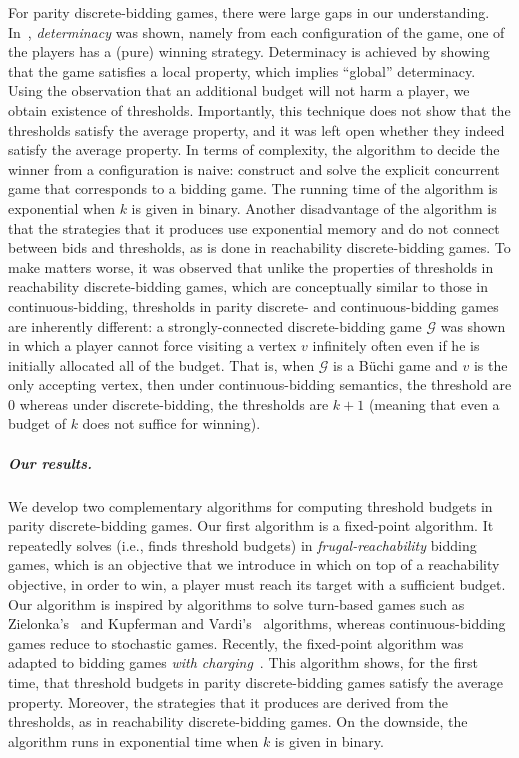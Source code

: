 \documentclass{article}\providecommand{\nequiv}{\not\equiv}\usepackage[a4paper,margin=20mm]{geometry}
\newcommand{\G}{{\mathcal G}}
\begin{document}
For parity discrete-bidding games, there were large gaps in our understanding. In~\cite{AAH21}, {\em determinacy} was shown, namely from each configuration of the game, one of the players has a (pure) winning strategy. Determinacy is achieved by showing that the game satisfies a local property, which implies ``global'' determinacy. Using the observation that an additional budget will not harm a player, we obtain existence of thresholds. Importantly, this technique does not show that the thresholds satisfy the average property, and it was left open whether they indeed satisfy the average property. In terms of complexity, the algorithm to decide the winner from a configuration is naive: construct and solve the explicit concurrent game that corresponds to a bidding game. The running time of the algorithm is exponential when $k$ is given in binary. Another disadvantage of the algorithm is that the strategies that it produces use exponential memory and do not connect between bids and thresholds, as is done in reachability discrete-bidding games. 
To make matters worse, it was observed that unlike the properties of thresholds in reachability discrete-bidding games, which are conceptually similar to those in continuous-bidding, thresholds in parity discrete- and continuous-bidding games are inherently different: a strongly-connected discrete-bidding game $\G$ was shown in which a player cannot force visiting a vertex $v$ infinitely often even if he is initially allocated all of the budget. That is, when $\G$ is a B\"uchi game and $v$ is the only accepting vertex, then under continuous-bidding semantics, the threshold are $0$ whereas under discrete-bidding, the thresholds are $k+1$ (meaning that even a budget of $k$ does not suffice for winning). 



\subparagraph*{Our results.}
We develop two complementary algorithms for computing threshold budgets in parity discrete-bidding games. 
Our first algorithm is a fixed-point algorithm. It repeatedly solves (i.e., finds threshold budgets) in {\em frugal-reachability} bidding games, which is an objective that we introduce in which on top of a reachability objective, in order to win, a player must reach its target with a sufficient budget. 
Our algorithm is inspired by algorithms to solve turn-based games such as Zielonka's~\cite{Zie98} and Kupferman and Vardi's~\cite{KV98} algorithms, whereas continuous-bidding games reduce to stochastic games. 
Recently, the fixed-point algorithm was adapted to bidding games {\em with charging}~\cite{AGHM24}.
This algorithm shows, for the first time, that threshold budgets in parity discrete-bidding games satisfy the average property. Moreover, the strategies that it produces are derived from the thresholds, as in reachability discrete-bidding games. 
On the downside, the algorithm runs in exponential time when $k$ is given in binary. 
\end{document}
